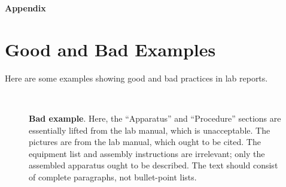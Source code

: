 \documentclass[11pt,a4paper]{article}
\begin{document}
\pagebreak

\begin{center}
  {\LARGE \textbf{Appendix}}
\end{center}

\appendix
\section{Good and Bad Examples}
\label{sec:bad-examples}

Here are some examples showing good and bad practices in lab reports.

\begin{figure}[h]
  \centering
   \\
  \caption{\small \textbf{Bad example}.  Here, the ``Apparatus'' and
    ``Procedure'' sections are essentially lifted from the lab manual,
    which is unacceptable.  The pictures are from the lab manual,
    which ought to be cited.  The equipment list and assembly
    instructions are irrelevant; only the assembled apparatus ought to
    be described.  The text should consist of complete paragraphs, not
    bullet-point lists.  }
\end{figure}
\end{document}
